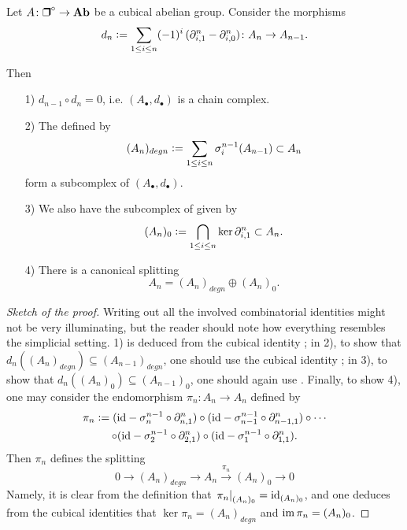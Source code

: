 \begin{lemma}
  \label{lemma:cubical-complex}
  Let $A\colon \bsquare^\circ \to \categ{Ab}$ be a cubical abelian
  group. Consider the morphisms
  \begin{equation}
    \label{eqn:cubical-differential}
    d_n \mathrel{\mathop:}= \sum_{1 \le i \le n} (-1)^i\,(\partial^n_{i,1} - \partial^n_{i,0})\colon A_n \to A_{n-1}.
  \end{equation}

  Then

  \begin{enumerate}
  \item[1)] $d_{n-1}\circ d_n = 0$, i.e. $(A_\bullet, d_\bullet)$ is a chain
    complex.

  \item[2)] The  defined by
    $$(A_n)_{degn} \mathrel{\mathop:}= \sum_{1\le i \le n} \sigma_i^{n-1} (A_{n-1}) \subset A_n$$
    form a subcomplex of $(A_\bullet, d_\bullet)$.

  \item[3)] We also have the subcomplex of  given by
    $$(A_n)_0 \mathrel{\mathop:}= \bigcap_{1\le i\le n} \ker \partial^n_{i,1} \subset A_n.$$

  \item[4)] There is a canonical splitting
    $$A_n = (A_n)_{degn} \oplus (A_n)_0.$$
  \end{enumerate}

  \begin{proof}[Sketch of the proof]
    Writing out all the involved combinatorial identities might not be very
    illuminating, but the reader should note how everything resembles the
    simplicial setting. 1) is deduced from the cubical identity
    ; in 2), to show that
    $d_n ((A_n)_{degn}) \subseteq (A_{n-1})_{degn}$, one should use the cubical
    identity ; in 3), to show that
    $d_n ((A_n)_0) \subseteq (A_{n-1})_0$, one should again use
    . Finally, to show 4), one may consider the
    endomorphism $\pi_n\colon A_n\to A_n$ defined by
    \begin{multline*}
      \pi_n \mathrel{\mathop:}= (\mathrm{id} - \sigma_n^{n-1}\circ \partial_{n,1}^n)\circ (\mathrm{id} - \sigma_{n-1}^{n-1}\circ \partial_{n-1,1}^n)\circ\cdots \\
      \circ (\mathrm{id} - \sigma_2^{n-1}\circ \partial_{2,1}^n)\circ (\mathrm{id} - \sigma_1^{n-1}\circ \partial_{1,1}^n).
    \end{multline*}
    Then $\pi_n$ defines the splitting
    $$0 \to (A_n)_{degn} \to A_n \xrightarrow{\pi_n} (A_n)_0 \to 0$$
    Namely, it is clear from the definition that
    $\left.\pi_n\right|_{(A_n)_0} = \mathrm{id}_{(A_n)_0}$, and one deduces from the
    cubical identities that $\ker \pi_n = (A_n)_{degn}$ and
    $\operatorname{im} \pi_n = (A_n)_0$.
  \end{proof}
\end{lemma}

